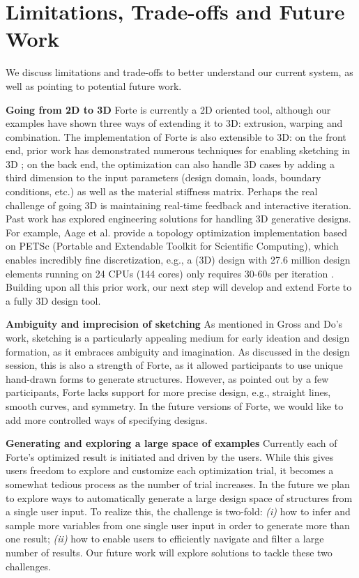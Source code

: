  
\section{Limitations, Trade-offs and Future Work}
We discuss limitations and trade-offs to better understand our current system, as well as pointing to potential future work.

\textbf{Going from 2D to 3D}
Forte is currently a 2D oriented tool, although our examples have shown three ways of extending it to 3D: extrusion, warping and combination. The implementation of Forte is also extensible to 3D: on the front end, prior work has demonstrated numerous techniques for enabling sketching in 3D \cite{igarashi2007teddy, bae2008ilovesketch, bae2009everybodylovessketch}; on the back end, the optimization can also handle 3D cases by adding a third dimension to the input parameters (design domain, loads, boundary conditions, etc.) as well as the material stiffness matrix. Perhaps the real challenge of going 3D is maintaining real-time feedback and interactive iteration. Past work has explored engineering solutions for handling 3D generative designs. For example, Aage et al. provide a topology optimization implementation based on PETSc (Portable and Extendable Toolkit for Scientific Computing), which enables incredibly fine discretization, e.g., a (3D) design with 27.6 million design elements running on 24 CPUs (144 cores) only requires 30-60s per iteration \cite{aage2014topology}. Building upon all this prior work, our next step will develop and extend Forte to a fully 3D design tool.

\textbf{Ambiguity and imprecision of sketching}
As mentioned in Gross and Do's work, sketching is a particularly appealing medium for early ideation and design formation, as it embraces ambiguity and imagination. As discussed in the design session, this is also a strength of Forte, as it allowed participants to use unique hand-drawn forms to generate structures. However, as pointed out by a few participants, Forte lacks support for more precise design, e.g., straight lines, smooth curves, and symmetry. In the future versions of Forte, we would like to add more controlled ways of specifying designs.

\textbf{Generating and exploring a large space of examples}
Currently each of Forte's optimized result is initiated and driven by the users. While this gives users freedom to explore and customize each optimization trial, it becomes a somewhat tedious process as the number of trial increases. In the future we plan to explore ways to automatically generate a large design space of structures from a single user input. To realize this, the challenge is two-fold: {\em(i)} how to infer and sample more variables from one single user input in order to generate more than one result; {\em(ii)} how to enable users to efficiently navigate and filter a large number of results. Our future work will explore solutions to tackle these two challenges.

